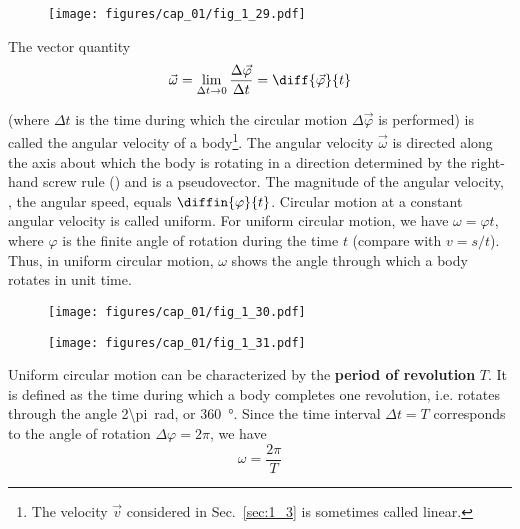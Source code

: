 \begin{figure}[t]
	\begin{center}
		\texttt{[image: figures/cap\_01/fig\_1\_29.pdf]}
		\caption[]{}
		\label{fig:1_29}
	\end{center}
	\vspace{-0.7cm}
\end{figure}

The vector quantity
\begin{equation}\label{eq:1_93}
\vec{\omega} = \lim_{\Delta t\to 0} \frac{\Delta\vec{\varphi}}{\Delta t} = \diff{\vec{\varphi}}{t}
\end{equation}

\noindent
(where $\Delta t$ is the time during which the circular motion $\Delta\vec{\varphi}$ is performed) is called the angular velocity of a body\footnote{The velocity $\vec{v}$ considered in Sec.~\ref{sec:1_3} is sometimes called linear.}. The angular velocity $\vec{\omega}$ is directed along the axis about which the body is rotating in a direction determined by the right-hand screw rule () and is a pseudovector. The magnitude of the angular velocity, \ie, the angular speed, equals $\diffin{\varphi}{t}$. Circular motion at a constant angular velocity is called uniform. For uniform circular motion, we have $\omega=\varphi t$, where $\varphi$ is the finite angle of rotation during the time $t$ (compare with $v=s/t$). Thus, in uniform circular motion, $\omega$ shows the angle through which a body rotates in unit time.

\begin{figure}[t]
	\begin{minipage}[t]{0.5\linewidth}
		\begin{center}
			\texttt{[image: figures/cap\_01/fig\_1\_30.pdf]}
			\caption[]{}
			\label{fig:1_30}
		\end{center}
	\end{minipage}
	\hspace{-0.1cm}
	\begin{minipage}[t]{0.5\linewidth}
		\begin{center}
			\texttt{[image: figures/cap\_01/fig\_1\_31.pdf]}
			\caption[]{}
			\label{fig:1_31}
		\end{center}
	\end{minipage}
	\vspace{-0.5cm}
\end{figure}

Uniform circular motion can be characterized by the \textbf{period of revolution} $T$. It is defined as the time  during which a body completes one revolution, i.e. rotates through the angle \SI{2\pi}{\radian}, or \SI{360}{\degree}. Since the time interval $\Delta t=T$ corresponds to the angle of rotation $\Delta\varphi=2\pi$, we have
\begin{equation}\label{eq:1_94}
\omega = \frac{2\pi}{T}
\end{equation}

